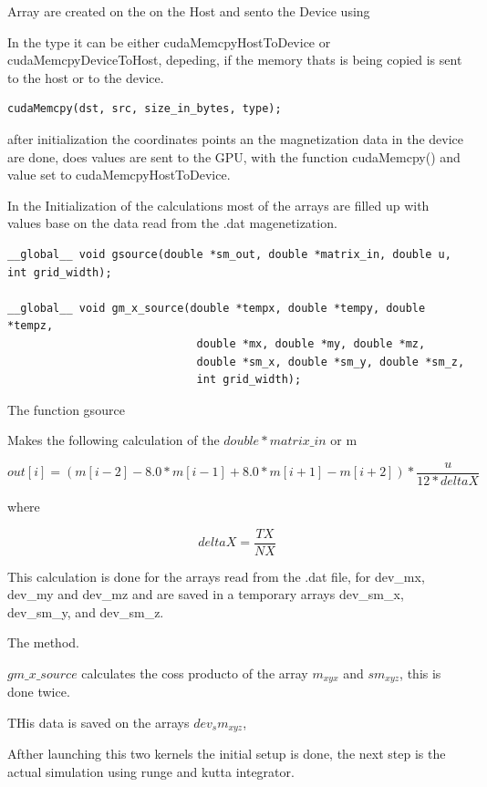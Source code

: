 Array are created on the on the Host and sento the Device using

In the type it can be either cudaMemcpyHostToDevice or cudaMemcpyDeviceToHost, depeding, if the memory thats is being copied is sent to the host or to the device.

\begin{lstlisting}[frame=none]
cudaMemcpy(dst, src, size_in_bytes, type);
\end{lstlisting}

after initialization the coordinates points an the magnetization data in the device are done, does values are sent to the GPU, with the function cudaMemcpy() and value set to cudaMemcpyHostToDevice.

In the Initialization of the calculations most of the arrays are filled up with values base on the data read from the .dat magenetization.

\begin{lstlisting}[frame=none]
__global__ void gsource(double *sm_out, double *matrix_in, double u, int grid_width);

__global__ void gm_x_source(double *tempx, double *tempy, double *tempz,
							 double *mx, double *my, double *mz,
							 double *sm_x, double *sm_y, double *sm_z,
							 int grid_width);
\end{lstlisting}


The function gsource

Makes the following calculation of the $double *matrix\_in$ or m


\begin{equation} \label{eq:gsource}
out[i] = (m[i-2] - 8.0*m[i-1] + 8.0*m[i+1] - m[i+2]) * \dfrac{u}{12 * deltaX }
\end{equation}

where

$$deltaX = \frac{TX}{NX}$$

This calculation is done for the arrays read from the .dat file, for dev\_mx, dev\_my and dev\_mz and are saved in a temporary arrays dev\_sm\_x, dev\_sm\_y, and dev\_sm\_z.

The method.

$gm\_x\_source$ calculates the coss producto of the array $m_{xyx}$ and $sm_{xyz}$, this is done twice.

THis data is saved on the arrays $dev_sm_{xyz}$,

Afther launching this two kernels the initial setup is done, the next step is the actual simulation using runge and kutta integrator.


